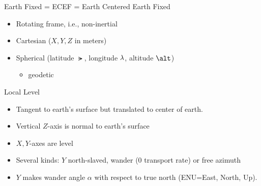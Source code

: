 \begin{frame}
Earth Fixed = ECEF = Earth Centered Earth Fixed
 \begin{itemize}
 \item Rotating frame, i.e., non-inertial
 \item Cartesian ($X,Y,Z$ in meters)
 \item Spherical (latitude $\lat$, longitude $\lambda$, altitude $\alt$)
 \begin{itemize}
 \item geodetic
 \end{itemize}
\end{itemize}
\end{frame}
\begin{frame}
Local Level
 \begin{itemize}
 \item Tangent to earth's surface but translated to center of
 earth.
 \item Vertical $Z$-axis is normal to earth's surface
 \item $X,Y$-axes are level
 \item Several kinds: $Y$ north-slaved, wander (0 transport rate) or free azimuth
 \item $Y$ makes wander angle $\alpha$ with respect to true north (ENU=East, North, Up).
\end{itemize}
\end{frame}

\begin{frame}

\vfill
\end{frame}


